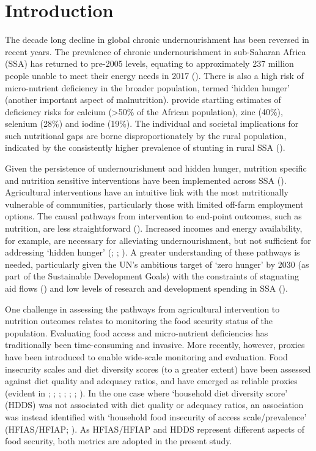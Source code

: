 \newpage

\section{Introduction}

The decade long decline in global chronic undernourishment has been reversed in recent years. The prevalence of chronic undernourishment in sub-Saharan Africa (SSA) has returned to pre-2005 levels, equating to approximately 237 million people unable to meet their energy needs in 2017 (\citealp{FAO2018}). There is also a high risk of micro-nutrient deficiency in the broader population, termed `hidden hunger' (another important aspect of malnutrition). \citet{Joy2014} provide startling estimates of deficiency risks for calcium ({\textgreater}50\% of the African population), zinc (40\%), selenium (28\%) and iodine (19\%). The individual and societal implications for such nutritional gaps are borne disproportionately by the rural population, indicated by the consistently higher prevalence of stunting in rural SSA (\citealp{Green2016}).

Given the persistence of undernourishment and hidden hunger, nutrition specific and nutrition sensitive interventions have been implemented across SSA (\citealp{DePee2017}). Agricultural interventions have an intuitive link with the most nutritionally vulnerable of communities, particularly those with limited off-farm employment options. The causal pathways from intervention to end-point outcomes, such as nutrition, are less straightforward (\citealp{Carletto2017}). Increased incomes and energy availability, for example, are necessary for alleviating undernourishment, but not sufficient for addressing `hidden hunger' (\citealp{Schipanski2016}; \citealp{McDermott2015}; \citealp{Hoddinott2012}). A greater understanding of these pathways is needed, particularly given the UN's ambitious target of `zero hunger' by 2030 (as part of the Sustainable Development Goals) with the constraints of stagnating aid flows (\citealp{OECD2015}) and low levels of research and development spending in SSA (\citealp{Pardey2016}).

One challenge in assessing the pathways from agricultural intervention to nutrition outcomes relates to monitoring the food security status of the population. Evaluating food access and micro-nutrient deficiencies has traditionally been time-consuming and invasive. More recently, however, proxies have been introduced to enable wide-scale monitoring and evaluation. Food insecurity scales and diet diversity scores (to a greater extent) have been assessed against diet quality and adequacy ratios, and have emerged as reliable proxies (evident in \citealp{Rah2010}; \citealp{Saha2009}; \citealp{Coates2007}; \citealp{Savy2005}; \citealp{Steyn2006}; \citealp{Arimond2004}; \citealp{Torheim2004}). In the one case where `household diet diversity score' (HDDS) was not associated with diet quality or adequacy ratios, an association was instead identified with `household food insecurity of access scale/prevalence' (HFIAS/HFIAP; \citealp{McDonald2015}). As HFIAS/HFIAP and HDDS represent different aspects of food security, both metrics are adopted in the present study.


